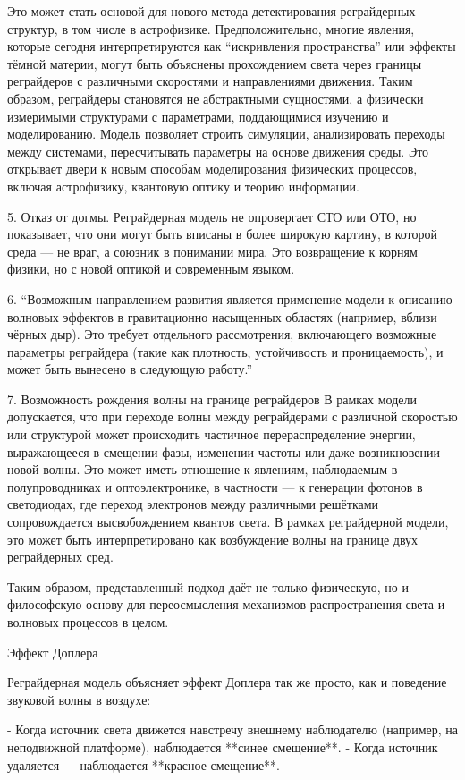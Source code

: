 \documentclass[12pt]{article}
\begin{document}
Это может стать основой для нового метода детектирования реграйдерных структур, в том числе в астрофизике. Предположительно, многие явления, которые сегодня интерпретируются как “искривления пространства” или эффекты тёмной материи, могут быть объяснены прохождением света через границы реграйдеров с различными скоростями и направлениями движения. Таким образом, реграйдеры становятся не абстрактными сущностями, а физически измеримыми структурами с параметрами, поддающимися изучению и моделированию.
Модель позволяет строить симуляции, анализировать переходы между системами, пересчитывать параметры на основе движения среды. Это открывает двери к новым способам моделирования физических процессов, включая астрофизику, квантовую оптику и теорию информации.

5. Отказ от догмы.
Реграйдерная модель не опровергает СТО или ОТО, но показывает, что они могут быть вписаны в более широкую картину, в которой среда — не враг, а союзник в понимании мира. Это возвращение к корням физики, но с новой оптикой и современным языком.

6. “Возможным направлением развития является применение модели к описанию волновых эффектов в гравитационно насыщенных областях (например, вблизи чёрных дыр). Это требует отдельного рассмотрения, включающего возможные параметры реграйдера (такие как плотность, устойчивость и проницаемость), и может быть вынесено в следующую работу.”

7. Возможность рождения волны на границе реграйдеров
В рамках модели допускается, что при переходе волны между реграйдерами с различной скоростью или структурой может происходить частичное перераспределение энергии, выражающееся в смещении фазы, изменении частоты или даже возникновении новой волны. Это может иметь отношение к явлениям, наблюдаемым в полупроводниках и оптоэлектронике, в частности — к генерации фотонов в светодиодах, где переход электронов между различными решётками сопровождается высвобождением квантов света. В рамках реграйдерной модели, это может быть интерпретировано как возбуждение волны на границе двух реграйдерных сред.

Таким образом, представленный подход даёт не только физическую, но и философскую основу для переосмысления механизмов распространения света и волновых процессов в целом.


Эффект Доплера

Реграйдерная модель объясняет эффект Доплера так же просто, как и поведение звуковой волны в воздухе:

- Когда источник света движется навстречу внешнему наблюдателю (например, на неподвижной платформе), наблюдается **синее смещение**.
- Когда источник удаляется — наблюдается **красное смещение**.
\end{document}
